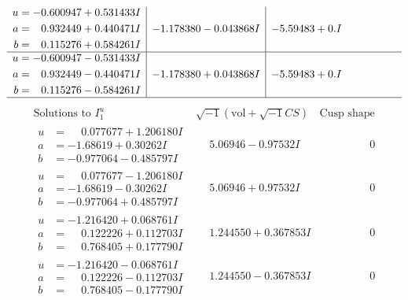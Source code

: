 \documentclass[1p]{elsarticle_modified}
\theoremstyle{definition}
\newcommand{\I}{\sqrt{-1}}
\begin{document}
$$\begin{array}{c|c|c}
\begin{aligned}
u &= -0.600947 + 0.531433 I \\
a &= \phantom{-}0.932449 + 0.440471 I \\
b &= \phantom{-}0.115276 + 0.584261 I\end{aligned}
 & -1.178380 - 0.043868 I & -5.59483 + 0. I\phantom{ +0.000000I} \\ \hline\begin{aligned}
u &= -0.600947 - 0.531433 I \\
a &= \phantom{-}0.932449 - 0.440471 I \\
b &= \phantom{-}0.115276 - 0.584261 I\end{aligned}
 & -1.178380 + 0.043868 I & -5.59483 + 0. I\phantom{ +0.000000I}\\
 \hline 
 \end{array}$$\newpage$$\begin{array}{c|c|c}  
\text{Solutions to }I^u_{1}& \I (\text{vol} + \sqrt{-1}CS) & \text{Cusp shape}\\
 \hline 
\begin{aligned}
u &= \phantom{-}0.077677 + 1.206180 I \\
a &= -1.68619 + 0.30262 I \\
b &= -0.977064 - 0.485797 I\end{aligned}
 & \phantom{-}5.06946 - 0.97532 I & \phantom{-0.000000 } 0 \\ \hline\begin{aligned}
u &= \phantom{-}0.077677 - 1.206180 I \\
a &= -1.68619 - 0.30262 I \\
b &= -0.977064 + 0.485797 I\end{aligned}
 & \phantom{-}5.06946 + 0.97532 I & \phantom{-0.000000 } 0 \\ \hline\begin{aligned}
u &= -1.216420 + 0.068761 I \\
a &= \phantom{-}0.122226 + 0.112703 I \\
b &= \phantom{-}0.768405 + 0.177790 I\end{aligned}
 & \phantom{-}1.244550 + 0.367853 I & \phantom{-0.000000 } 0 \\ \hline\begin{aligned}
u &= -1.216420 - 0.068761 I \\
a &= \phantom{-}0.122226 - 0.112703 I \\
b &= \phantom{-}0.768405 - 0.177790 I\end{aligned}
 & \phantom{-}1.244550 - 0.367853 I & \phantom{-0.000000 } 0 \\ \hline\begin{aligned}

\end{aligned}
\end{array}$$
\end{document}
